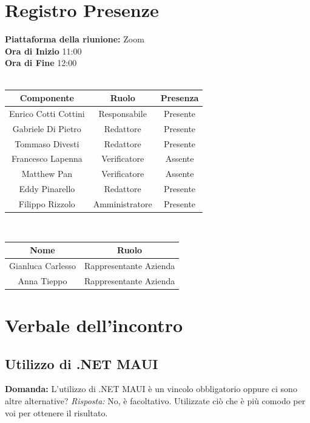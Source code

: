 \documentclass{article}
\begin{document}
\section{Registro Presenze}
\textbf{Piattaforma della riunione:} Zoom \\
\textbf{Ora di Inizio} 11:00\\
\textbf{Ora di Fine} 12:00\\
\\
\begin{tabular}{|c|c|c|}
    \hline
    \textbf{Componente} & \textbf{Ruolo} & \textbf{Presenza}\\
    \hline
    Enrico Cotti Cottini & Responsabile & Presente \\ 
    \hline
    Gabriele Di Pietro & Redattore & Presente \\ 
    \hline
    Tommaso Divesti & Redattore & Presente \\ 
    \hline 
    Francesco Lapenna & Verificatore & Assente \\ 
    \hline
    Matthew Pan & Verificatore & Assente \\ 
    \hline 
    Eddy Pinarello & Redattore & Presente \\ 
    \hline 
    Filippo Rizzolo & Amministratore & Presente \\ 
    \hline 
\end{tabular}
\\
\newline
\newline
\begin{tabular}{|c|c|}
    \hline
    \textbf{Nome} & \textbf{Ruolo}\\
    \hline
    Gianluca Carlesso & Rappresentante Azienda \\
    \hline
    Anna Tieppo & Rappresentante Azienda \\
    \hline
\end{tabular}
\newpage

\section{Verbale dell'incontro}

\subsection{Utilizzo di .NET MAUI}
\textbf{Domanda:} L'utilizzo di .NET MAUI è un vincolo obbligatorio oppure ci sono altre alternative? \newline
\textit{Risposta:} No, è facoltativo. Utilizzate ciò che è più comodo per voi per ottenere il risultato.
\end{document}
